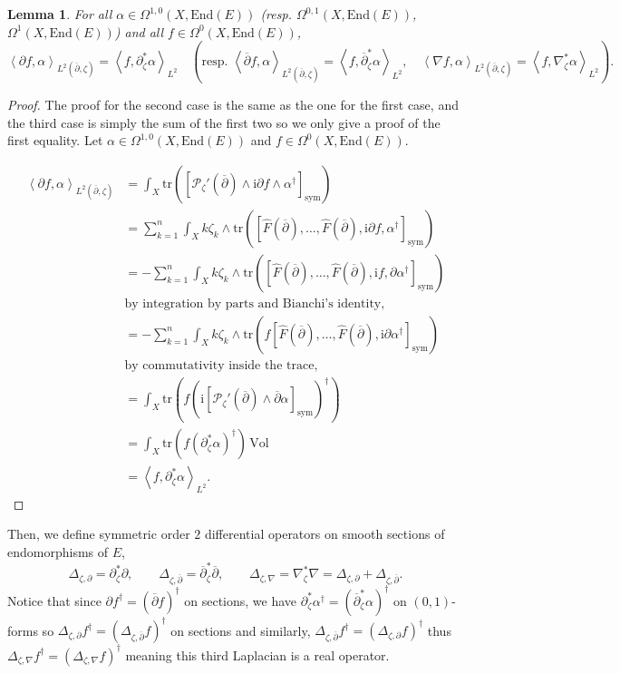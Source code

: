 \documentclass{article}
\newtheorem{lemma}[theorem]{Lemma}
\theoremstyle{remark}
\theoremstyle{definition}
\newcommand{\End}{\mathrm{End}}
\newcommand{\tr}{\mathrm{tr}}
\newcommand{\Vol}{\mathrm{Vol}}
\renewcommand{\i}{\boldsymbol{\mathrm{i}}}
\newcommand{\scal}[2]{\left< #1,#2 \right>}
\newcommand{\mP}{\mathcal{P}}
\newcommand{\dbar}{\overline{\partial}}
\newcommand{\sym}{\mathrm{sym}}
\begin{document}
\begin{lemma}\label{LEM:Adjoints d et dbar}
    For all $\alpha \in \Omega^{1,0}(X,\End(E))$ (resp. $\Omega^{0,1}(X,\End(E))$, $\Omega^1(X,\End(E))$) and all $f \in \Omega^0(X,\End(E))$,
    $$
    \scal{\partial f}{\alpha}_{L^2(\dbar,\zeta)} = \scal{f}{\partial_\zeta^*\alpha}_{L^2} \quad (\textrm{resp. } \scal{\dbar f}{\alpha}_{L^2(\dbar,\zeta)} = \scal{f}{\dbar_\zeta^*\alpha}_{L^2}, \quad \scal{\nabla f}{\alpha}_{L^2(\dbar,\zeta)} = \scal{f}{\nabla_\zeta^*\alpha}_{L^2}).
    $$
\end{lemma}
\begin{proof}
The proof for the second case is the same as the one for the first case, and the third case is simply the sum of the first two so we only give a proof of the first equality. Let $\alpha \in \Omega^{1,0}(X,\End(E))$ and $f \in \Omega^0(X,\End(E))$.

{\allowdisplaybreaks
\begin{align*}
    \scal{\partial f}{\alpha}_{L^2(\dbar,\zeta)} & = \int_X \tr([\mP_\zeta'(\dbar) \wedge \i\partial f \wedge \alpha^\dagger]_\sym)\\
    & = \sum_{k = 1}^n \int_X k\zeta_k \wedge \tr([\hat{F}(\dbar),\ldots,\hat{F}(\dbar),\i\partial f,\alpha^\dagger]_\sym)\\
    & = -\sum_{k = 1}^n \int_X k\zeta_k \wedge \tr([\hat{F}(\dbar),\ldots,\hat{F}(\dbar),\i f,\partial\alpha^\dagger]_\sym)\\
    & \textrm{by integration by parts and Bianchi's identity,}\\
    & = -\sum_{k = 1}^n \int_X k\zeta_k \wedge \tr(f[\hat{F}(\dbar),\ldots,\hat{F}(\dbar),\i\partial\alpha^\dagger]_\sym)\\
    & \textrm{by commutativity inside the trace,}\\
    & = \int_X \tr(f(\i[\mP_\zeta'(\dbar) \wedge \dbar\alpha]_\sym)^\dagger)\\
    & = \int_X \tr(f(\partial_\zeta^*\alpha)^\dagger) \, \Vol\\
    & = \scal{f}{\partial_\zeta^*\alpha}_{L^2}.
\end{align*}}
\end{proof}

Then, we define symmetric order $2$ differential operators on smooth sections of endomorphisms of $E$,
$$
\Delta_{\zeta,\partial} = \partial_\zeta^*\partial, \qquad \Delta_{\zeta,\dbar} = \dbar_\zeta^*\dbar, \qquad \Delta_{\zeta,\nabla} = \nabla_\zeta^*\nabla = \Delta_{\zeta,\partial} + \Delta_{\zeta,\dbar}.
$$
Notice that since $\partial f^\dagger = (\dbar f)^\dagger$ on sections, we have $\partial_\zeta^*\alpha^\dagger = (\dbar_\zeta^*\alpha)^\dagger$ on $(0,1)$-forms so $\Delta_{\zeta,\partial}f^\dagger = (\Delta_{\zeta,\dbar}f)^\dagger$ on sections and similarly, $\Delta_{\zeta,\dbar}f^\dagger = (\Delta_{\zeta,\partial}f)^\dagger$ thus $\Delta_{\zeta,\nabla}f^\dagger = (\Delta_{\zeta,\nabla}f)^\dagger$ meaning this third Laplacian is a real operator.
\end{document}
